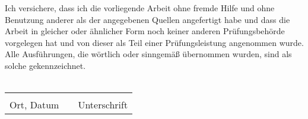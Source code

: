Ich versichere, dass ich die vorliegende Arbeit ohne fremde Hilfe und ohne Benutzung 
anderer als der angegebenen Quellen angefertigt habe und dass die Arbeit in gleicher 
oder ähnlicher Form noch keiner anderen Prüfungsbehörde vorgelegen hat und von dieser 
als Teil einer Prüfungsleistung angenommen wurde. Alle Ausführungen, die wörtlich oder 
sinngemäß übernommen wurden, sind als solche gekennzeichnet.\\
\\
\begin{table}[!htb]
\centering
\begin{tabularx}{\textwidth}{lXl}

       \hspace{6cm} &  & \hspace{6cm} \\
\cline{1-1}\cline{3-3}
Ort, Datum  &  & Unterschrift
\end{tabularx}
\end{table}